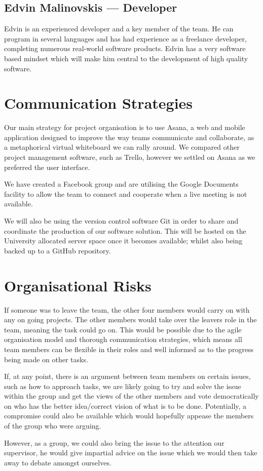 \documentclass{article}
\begin{document}
\subsection{Edvin Malinovskis --- Developer}
Edvin is an experienced developer and a key member of the team. He can program
in several languages and has had experience as a freelance developer,
completing numerous real-world software products. Edvin has a very software
based mindset which will make him central to the development of high quality
software. 

\section{Communication Strategies}
Our main strategy for project organisation is to use Asana, a web and mobile
application designed to improve the way teams communicate and collaborate, as a
metaphorical virtual whiteboard we can rally around. We compared other project
management software, such as Trello, however we settled on Asana as we
preferred the user interface.

We have created a Facebook group and are utilising the Google Documents
facility to allow the team to connect and cooperate when a live meeting is not
available.

We will also be using the version control software Git in order to share and
coordinate the production of our software solution. This will be hosted on the
University allocated server space once it becomes available; whilst also being
backed up to a GitHub repository.

\section{Organisational Risks}
If someone was to leave the team, the other four members would carry on with
any on going projects. The other members would take over the leavers role in
the team, meaning the task could go on. This would be possible due to the agile
organisation model and thorough communication strategies, which means all team
members can be flexible in their roles and well informed as to the progress
being made on other tasks.

If, at any point, there is an argument between team members on certain issues,
such as how to approach tasks, we are likely going to try and solve the issue
within the group and get the views of the other members and vote democratically
on who has the better idea/correct vision of what is to be done. Potentially, a
compromise could also be available which would hopefully appease the members of
the group who were arguing.

However, as a group, we could also bring the issue to the attention our
supervisor, he would give impartial advice on the issue which we would then
take away to debate amongst ourselves.
\end{document}
